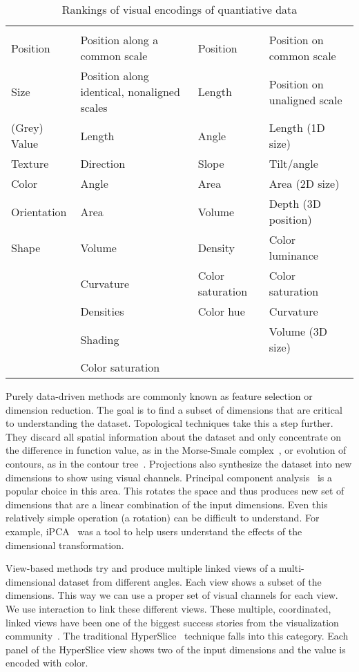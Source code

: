 \begin{table}
  \caption{Rankings of visual encodings of quantiative data}
  \label{tbl:visual_encodings}
  \begin{tabular}{llll}
    \cite{Bertin:1967} & \cite{Cleveland:1984} & \cite{Mackinlay:1986} & \cite{Munzner:2014} \\
     Position & Position along a common scale & Position & Position on common scale \\
     Size & Position along identical, nonaligned scales & Length & Position on unaligned scale \\
     (Grey) Value & Length & Angle & Length (1D size) \\
     Texture & Direction & Slope & Tilt/angle \\
     Color & Angle & Area & Area (2D size) \\
     Orientation & Area & Volume & Depth (3D position) \\
     Shape & Volume & Density & Color luminance\\
     & Curvature & Color saturation & Color saturation \\
     & Densities & Color hue & Curvature \\
     & Shading & & Volume (3D size) \\
     & Color saturation &           & 
  \end{tabular}
\end{table}

Purely data-driven methods are commonly known as feature selection or dimension
reduction. The goal is to find a subset of dimensions that are critical to
understanding the dataset. Topological techniques take this a step further.
They discard all spatial information about the dataset and only concentrate on
the difference in function value, as in the Morse-Smale
complex~\cite{Gyulassy:2012a}, or evolution of contours, as in the contour
tree~\cite{Carr:2003a}.  Projections also synthesize the dataset into new
dimensions to show using visual channels. Principal component
analysis~\cite{PCA} is a popular choice in this area. This rotates the space
and thus produces new set of dimensions that are a linear combination of the
input dimensions. Even this relatively simple operation (a rotation) can be
difficult to understand. For example, iPCA~\cite{Jeong:2009a} was a tool to
help users understand the effects of the dimensional transformation.

View-based methods try and produce multiple linked views of a multi-dimensional
dataset from different angles. Each view shows a subset of the dimensions.
This way we can use a proper set of visual channels for each view.  We use
interaction to link these different views. These multiple, coordinated, linked
views have been one of the biggest success stories from the visualization
community~\cite{Rao:1994}. The traditional HyperSlice~\cite{Wijk:1993}
technique falls into this category. Each panel of the HyperSlice view shows two
of the input dimensions and the value is encoded with color.


